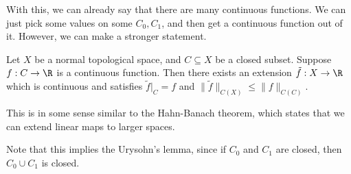 \documentclass[a4paper]{article}
\begin{document}
With this, we can already say that there are many continuous functions. We can just pick some values on some $C_0, C_1$, and then get a continuous function out of it. However, we can make a stronger statement.

\begin{thm}
  Let $X$ be a normal topological space, and $C\subseteq X$ be a closed subset. Suppose $f: C \to \R$ is a continuous function. Then there exists an extension $\tilde{f}: X \to \R$ which is continuous and satisfies $\tilde{f}|_C = f$ and $\|\tilde{f}\|_{C(X)} \leq \|f\|_{C(C)}$.
\end{thm}
This is in some sense similar to the Hahn-Banach theorem, which states that we can extend linear maps to larger spaces.

Note that this implies the Urysohn's lemma, since if $C_0$ and $C_1$ are closed, then $C_0\cup C_1$ is closed.
\end{document}
